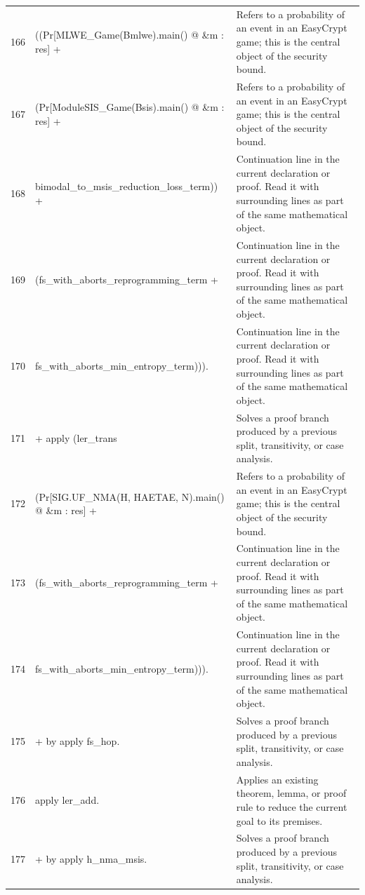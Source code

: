 \documentclass[10pt]{article}
\begin{document}
\begin{longtable}{r L{0.53\textwidth} L{0.37\textwidth}}
166 & {\ttfamily\scriptsize   ((Pr[MLWE\_Game(Bmlwe).main() @ \&m : res] +} & Refers to a probability of an event in an EasyCrypt game; this is the central object of the security bound. \\
167 & {\ttfamily\scriptsize       (Pr[ModuleSIS\_Game(Bsis).main() @ \&m : res] +} & Refers to a probability of an event in an EasyCrypt game; this is the central object of the security bound. \\
168 & {\ttfamily\scriptsize         bimodal\_to\_msis\_reduction\_loss\_term)) +} & Continuation line in the current declaration or proof.  Read it with surrounding lines as part of the same mathematical object. \\
169 & {\ttfamily\scriptsize     (fs\_with\_aborts\_reprogramming\_term +} & Continuation line in the current declaration or proof.  Read it with surrounding lines as part of the same mathematical object. \\
170 & {\ttfamily\scriptsize       fs\_with\_aborts\_min\_entropy\_term))).} & Continuation line in the current declaration or proof.  Read it with surrounding lines as part of the same mathematical object. \\
171 & {\ttfamily\scriptsize + apply (ler\_trans} & Solves a proof branch produced by a previous split, transitivity, or case analysis. \\
172 & {\ttfamily\scriptsize     (Pr[SIG.UF\_NMA(H, HAETAE, N).main() @ \&m : res] +} & Refers to a probability of an event in an EasyCrypt game; this is the central object of the security bound. \\
173 & {\ttfamily\scriptsize       (fs\_with\_aborts\_reprogramming\_term +} & Continuation line in the current declaration or proof.  Read it with surrounding lines as part of the same mathematical object. \\
174 & {\ttfamily\scriptsize         fs\_with\_aborts\_min\_entropy\_term))).} & Continuation line in the current declaration or proof.  Read it with surrounding lines as part of the same mathematical object. \\
175 & {\ttfamily\scriptsize   + by apply fs\_hop.} & Solves a proof branch produced by a previous split, transitivity, or case analysis. \\
176 & {\ttfamily\scriptsize   apply ler\_add.} & Applies an existing theorem, lemma, or proof rule to reduce the current goal to its premises. \\
177 & {\ttfamily\scriptsize   + by apply h\_nma\_msis.} & Solves a proof branch produced by a previous split, transitivity, or case analysis. \\

\end{longtable}
\end{document}
